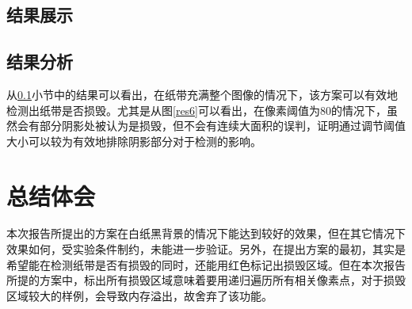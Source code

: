\documentclass[UTF8]{ctexart}
\begin{document}
		\subsection{结果展示}\label{show}
%	
%		
%		
%		
%		
%		
%	
		\subsection{结果分析}
			\indent 从\ref{show}小节中的结果可以看出，在纸带充满整个图像的情况下，该方案可以有效地检测出纸带是否损毁。尤其是从图\ref{res6}可以看出，在像素阈值为$80$的情况下，虽然会有部分阴影处被认为是损毁，但不会有连续大面积的误判，证明通过调节阈值大小可以较为有效地排除阴影部分对于检测的影响。
	\section{总结体会}
		\indent 本次报告所提出的方案在白纸黑背景的情况下能达到较好的效果，但在其它情况下效果如何，受实验条件制约，未能进一步验证。另外，在提出方案的最初，其实是希望能在检测纸带是否有损毁的同时，还能用红色标记出损毁区域。但在本次报告所提的方案中，标出所有损毁区域意味着要用递归遍历所有相关像素点，对于损毁区域较大的样例，会导致内存溢出，故舍弃了该功能。

%
\end{document}
